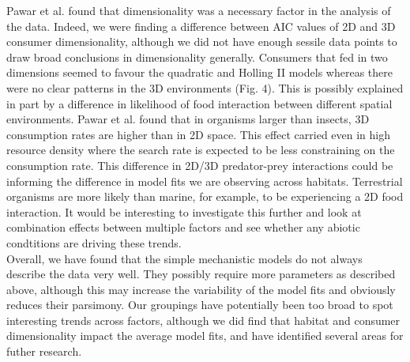\documentclass[11pt]{article}
\begin{document}
	Pawar et al. found that dimensionality was a necessary factor in the analysis of the data. Indeed, we were finding a difference between AIC values of 2D and 3D consumer dimensionality, although we did not have enough sessile data points to draw broad conclusions in dimensionality generally. Consumers that fed in two dimensions seemed to favour the quadratic and Holling II models whereas there were no clear patterns in the 3D environments (Fig. 4). This is possibly explained in part by a difference in likelihood of food interaction between different spatial environments. Pawar et al. found that in organisms larger than insects, 3D consumption rates are higher than in 2D space. This effect carried even in high resource density where the search rate is expected to be less constraining on the consumption rate. This difference in 2D/3D predator-prey interactions could be informing the difference in model fits we are observing across habitats. Terrestrial organisms are more likely than marine, for example, to be experiencing a 2D food interaction. It would be interesting to investigate this further and look at combination effects between multiple factors and see whether any abiotic condtitions are driving these trends. \\

	Overall, we have found that the simple mechanistic models do not always describe the data very well. They possibly require more parameters as described above, although this may increase the variability of the model fits and obviously reduces their parsimony. Our groupings have potentially been too broad to spot interesting trends across factors, although we did find that habitat and consumer dimensionality impact the average model fits, and have identified several areas for futher research. 

	\newpage

	\printbibliography

	
\end{document}
